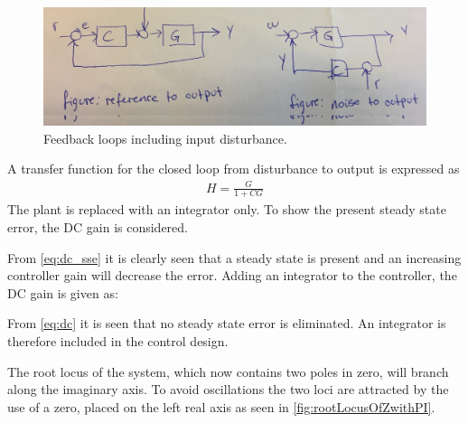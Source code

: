 \begin{figure}[H]
	\centering
	\includegraphics[width=.6\textwidth]{figures/inputdisturbance.png}
	\caption{Feedback loops including input disturbance.}
	\label{fig:rootLocusOfZwithPI}
\end{figure}
A transfer function for the closed loop from disturbance to output is expressed as
\begin{align}
H=\frac{G}{1+CG}
\end{align}  
The plant is replaced with an integrator only. To show the present steady state error, the DC gain is considered.
\begin{where}
\end{where}
From \autoref{eq:dc_sse} it is clearly seen that a steady state is present and an increasing controller gain will decrease the error.
Adding an integrator to the controller, the DC gain is given as:
\begin{where}
\end{where}
From \autoref{eq:dc} it is seen that no steady state error is eliminated. 
An integrator is therefore included in the control design. 

The root locus of the system, which now contains two poles in zero, will branch along the imaginary axis. To avoid oscillations the two loci are attracted by the use of a zero, placed on the left real axis as seen in \autoref{fig:rootLocusOfZwithPI}.

